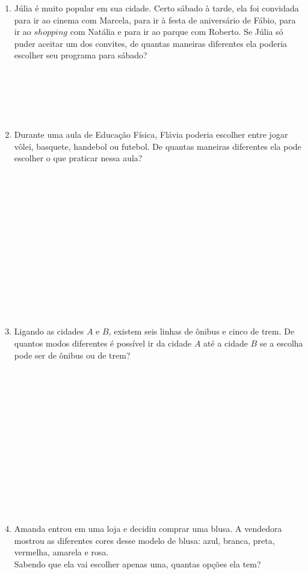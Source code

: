 \documentclass[a4paper,14pt]{article}
\begin{document}
\begin{multicols}{2}
\begin{enumerate}
			\item Júlia é muito popular em sua cidade. Certo sábado à tarde, ela foi convidada para ir ao cinema com Marcela, para ir à festa de aniversário de Fábio, para ir ao $shopping$ com Natália e para ir ao parque com Roberto. Se Júlia só puder aceitar um dos convites, de quantas maneiras diferentes ela poderia escolher seu programa para sábado? \\\\\\\\\\\\
			\item Durante uma aula de Educação Física, Flávia poderia escolher entre jogar vôlei, basquete, handebol ou futebol. De quantas maneiras diferentes ela pode escolher o que praticar nessa aula? \\\\\\\\\\\\\\\\\\\\\\\\\\\\
			\item Ligando as cidades $A$ e $B$, existem seis linhas de ônibus e cinco de trem. De quantos modos diferentes é possível ir da cidade $A$ até a cidade $B$ se a escolha pode ser de ônibus ou de trem? \\\\\\\\\\\\\\\\\\\\\\\\\\\\
			\item Amanda entrou em uma loja e decidiu comprar uma blusa. A vendedora mostrou as diferentes cores desse modelo de blusa: azul, branca, preta, vermelha, amarela e rosa. \\
			Sabendo que ela vai escolher apenas uma, quantas opções ela tem? \\\\\\\\\\\\\\\\\\\\\\\\

\end{enumerate}
\end{multicols}
\end{document}
